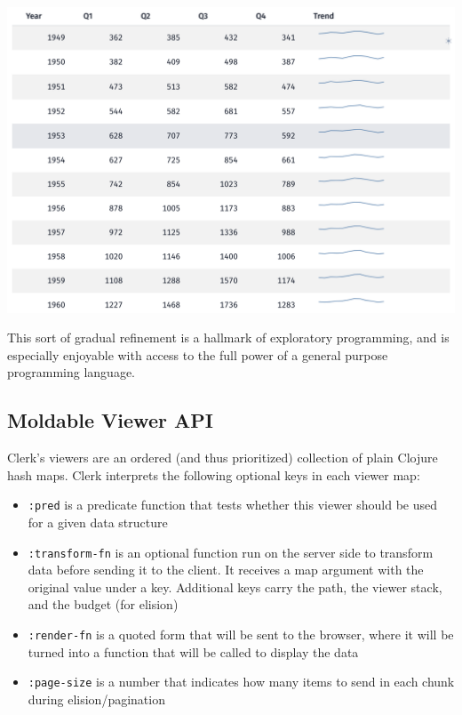 \documentclass[sigconf,screen]{acmart}
\newcommand{\passthrough}[1]{#1}
\providecommand{\tightlist}{%
  \setlength{\itemsep}{0pt}\setlength{\parskip}{0pt}}
\begin{document}
\includegraphics{images/anon-expr-5dsSs4YJ9LYoxsu8USvFMpW5wGuDa3-result.png}

This sort of gradual refinement is a hallmark of exploratory programming, and is especially enjoyable with access to the full power of a general purpose programming language.

\hypertarget{moldable-viewer-api}{%
\subsection{Moldable Viewer API}\label{moldable-viewer-api}}

Clerk's viewers are an ordered (and thus prioritized) collection of plain Clojure hash maps. Clerk interprets the following optional keys in each viewer map:

\begin{itemize}
\tightlist
\item
  \passthrough{\lstinline!:pred!} is a predicate function that tests whether this viewer should be used for a given data structure
\item
  \passthrough{\lstinline!:transform-fn!} is an optional function run on the server side to transform data before sending it to the client. It receives a map argument with the original value under a key. Additional keys carry the path, the viewer stack, and the budget (for elision)
\item
  \passthrough{\lstinline!:render-fn!} is a quoted form that will be sent to the browser, where it will be turned into a function that will be called to display the data
\item
  \passthrough{\lstinline!:page-size!} is a number that indicates how many items to send in each chunk during elision/pagination
\end{itemize}
\end{document}
